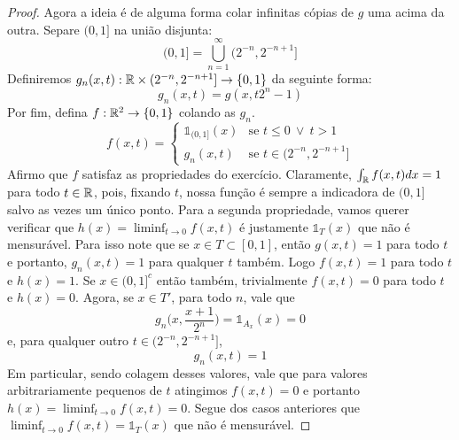 \begin{proof}
    Agora a  ideia é de alguma forma colar infinitas cópias de $g$ uma acima da outra.
    Separe $(0,1]$ na união disjunta:
    $$(0,1] = \bigcup_{n=1}^{\infty} (2^{-n}, 2^{-n + 1}]$$
    Definiremos $g_n(x,t) : \mathbb{R} \times (2^{-n},2^{-n + 1}] \rightarrow \{0,1\}$ da seguinte forma:
    $$g_n(x, t) = g(x, t2^n - 1)$$
    Por fim, defina $f :\mathbb{R}^2 \rightarrow \{0,1\}$ colando as $g_n$.
    $$f(x,t) = \begin{cases}
        \mathds{1}_{(0,1]}(x) & \text{se } t \leq 0 \ \lor \ t > 1\\
        g_n(x,t) & \text{se } t \in (2^{-n}, 2^{-n + 1}] 
    \end{cases}$$
    Afirmo que $f$ satisfaz as propriedades do exercício. Claramente,
    $\int_{\mathbb{R}} f(x,t) dx = 1$ para todo $t \in \mathbb{R}$, pois, fixando $t$, nossa 
    função é sempre a indicadora de $(0,1]$ salvo as vezes um único ponto. Para a segunda propriedade,
    vamos querer verificar que $h(x) = \liminf_{t \to 0} f(x,t)$ é justamente $\mathds{1}_T(x)$ que não é mensurável.
    Para isso note que se $x \in T \subset [0,1]$, então $g(x,t) = 1$ para todo $t$ e portanto, $g_n(x,t) = 1$ para qualquer $t$ também.
    Logo $f(x,t) = 1$ para todo $t$ e $h(x) = 1$. Se $x \in (0,1]^c$ então também, trivialmente $f(x,t) = 0$ para todo $t$
    e $h(x) = 0$. Agora, se $x \in T'$, para todo $n$, vale que 
    $$g_n\bigg(x, \frac{x + 1}{2^n}\bigg) = \mathds{1}_{A_x}(x) = 0$$
    e, para qualquer outro $t \in (2^{-n}, 2^{-n + 1}]$,
    $$g_n(x, t) = 1$$
    Em particular, sendo colagem desses valores, vale que para valores arbitrariamente pequenos de $t$ atingimos
    $f(x,t) = 0$ e portanto $h(x) = \liminf_{t \to 0} f(x,t) = 0$. Segue dos casos anteriores que $\liminf_{t \to 0} f(x,t)= \mathds{1}_T(x)$
    que não é mensurável.
\end{proof}

